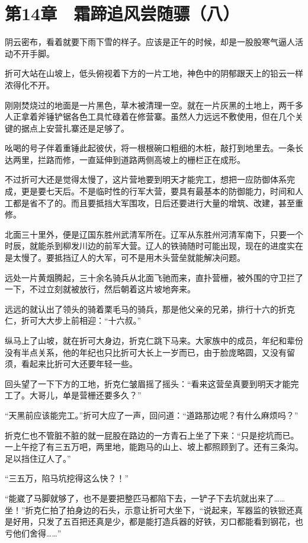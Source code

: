 \section{第14章　霜蹄追风尝随骠（八）}

阴云密布，看着就要下雨下雪的样子。应该是正午的时候，却是一股股寒气逼人活动不开手脚。

折可大站在山坡上，低头俯视着下方的一片工地，神色中的阴郁跟天上的铅云一样浓得化不开。

刚刚焚烧过的地面是一片黑色，草木被清理一空。就在一片灰黑的土地上，两千多人正拿着斧锤铲锯各色工具忙碌着在修营寨。虽然人力远远不敷使用，但在几个关键的据点上安营扎寨还是足够了。

吆喝的号子伴着重锤此起彼伏，将一根根碗口粗细的木桩，敲打到地里去。一条长达两里，拦路而修，一直延伸到道路两侧高坡上的栅栏正在成形。

不过折可大还是觉得太慢了，这片营地要到明天才能完工，想把一应防御体系完成，更是要七天后。不是临时性的行军大营，要具有最基本的防御能力，时间和人工都是省不了的。而且要抵挡大军围攻，日后还要进行大量的增筑、改建，甚至重修。

北面三十里外，便是辽国东胜州武清军所在。辽军从东胜州河清军南下，只要一个时辰，就能杀到柳发川边的前军大营。辽人的铁骑随时可能出现，现在的进度实在是太慢了。要抵挡辽人的大军，可不是用木头营垒就能解决问题。

远处一片黄烟腾起，三十余名骑兵从北面飞驰而来，直扑营栅，被外围的守卫拦了一下，不过立刻就被放行，然后朝着这片坡地奔来。

远远的就认出了领头的骑着栗毛马的骑兵，那是他父亲的兄弟，排行十六的折克仁，折可大大步上前相迎：“十六叔。”

纵马上了山坡，就在折可大身边，折克仁跳下马来。大家族中的成员，年纪和辈份没有半点关系，他的年纪也只比折可大长上一岁而已，由于脸庞略圆，又没有留须，看起来比折可大还要年轻一些。

回头望了一下下方的工地，折克仁皱眉摇了摇头：“看来这营垒真要到明天才能完工了。大哥儿，单是营栅还要多久？”

“天黑前应该能完工。”折可大应了一声，回问道：“道路那边呢？有什么麻烦吗？”

折克仁也不管脏不脏的就一屁股在路边的一方青石上坐了下来：“只是挖坑而已。一上午挖了有三五万吧，两里地，能跑马的山上、坡上都照顾到了。还有三条沟。足以挡住辽人了。”

“三五万，陷马坑挖得这么快？！”

“能崴了马脚就够了，也不是要把整匹马都陷下去，一铲子下去坑就出来了……坐！”折克仁拍了拍身边的石头，示意让折可大坐下，“说起来，军器监的铁锨还真是好用，只发了五百把还真是少，都是能打造兵器的好铁，刃口都能看到钢花，也亏他们舍得……”

